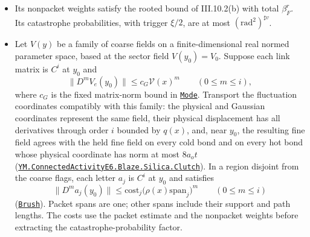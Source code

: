 \documentclass[
  letterpaper,
  11pt]{article}
\providecommand{\tightlist}{%
  \setlength{\itemsep}{0pt}\setlength{\parskip}{0pt}}
\begin{document}
\begin{itemize}
\tightlist
\item
  Its nonpacket weights satisfy the rooted bound of III.10.2(b) with
  total \(\beta_F^r\). Its catastrophe probabilities, with trigger
  \(\xi/2\), are at most \((\mathrm{rad}^2)^{\sharp v}\).
\item
  Let \(V(y)\) be a family of coarse fields on a finite-dimensional real
  normed parameter space, based at the sector field \(V(y_0)=V_0\).
  Suppose each link matrix is \(C^i\) at \(y_0\) and
  \[\|D^m V_e(y_0)\|\le c_G\mathcal V(x)^m\qquad(0\le m\le i),\] where
  \(c_G\) is the fixed matrix-norm bound in
  \href{https://github.com/yang-mills-group/OpenAI-YM-20261028/blob/3456e5e75cf8d4cd558955a5c7638fba2d68f464/YM/AnalyticNext/CONNECTED_ACTIVITY_JETS_E6/Tint.lean\#L21-L23}{\texttt{Mode}}.
  Transport the fluctuation coordinates compatibly with this family: the
  physical and Gaussian coordinates represent the same field, their
  physical displacement has all derivatives through order \(i\) bounded
  by \(q(x)\), and, near \(y_0\), the resulting fine field agrees with
  the held fine field on every cold bond and on every hot bond whose
  physical coordinate has norm at most \(8a_ot\)
  (\href{https://github.com/yang-mills-group/OpenAI-YM-20261028/blob/3456e5e75cf8d4cd558955a5c7638fba2d68f464/YM/AnalyticNext/CONNECTED_ACTIVITY_JETS_E6/Eskim.lean\#L86-L95}{\texttt{YM.ConnectedActivityE6.Blaze.Silica.Clutch}}).
  In a region disjoint from the coarse flags, each letter \(a_j\) is
  \(C^i\) at \(y_0\) and satisfies
  \[\|D^m a_j(y_0)\|\le\mathrm{cost}_j\big(\rho(x)\mathrm{span}_j\big)^m\qquad(0\le m\le i)\]
  (\href{https://github.com/yang-mills-group/OpenAI-YM-20261028/blob/3456e5e75cf8d4cd558955a5c7638fba2d68f464/YM/AnalyticNext/CONNECTED_ACTIVITY_JETS_E6/Brush.lean\#L44-L47}{\texttt{Brush}}).
  Packet spans are one; other spans include their support and path
  lengths. The costs use the packet estimate and the nonpacket weights
  before extracting the catastrophe-probability factor.
\end{itemize}
\end{document}

